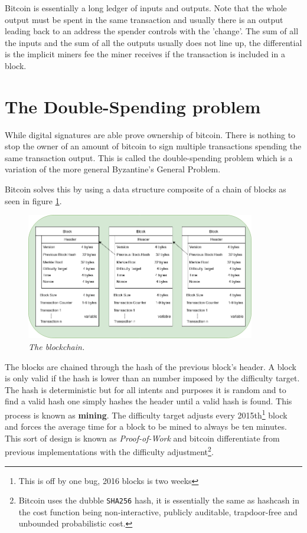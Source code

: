 Bitcoin is essentially a long ledger of inputs and outputs. Note that the whole output must be spent in the same transaction and usually there is an output leading back to an address the spender controls with the 'change'. The sum of all the inputs and the sum of all the outputs usually does not line up, the differential is the implicit miners fee the miner receives if the transaction is included in a block. 

\section{The Double-Spending problem}

While digital signatures are able prove ownership of bitcoin. There is nothing to stop the owner of an amount of bitcoin to sign multiple transactions spending the same transaction output. This is called the double-spending problem which is a variation of the more general Byzantine's General Problem.

Bitcoin solves this by using a data structure composite of a chain of blocks as seen in figure \ref{fig:blockchain}.

\begin{figure}[!htb]
	\hspace*{-2cm} 
	\centering
	\includegraphics[width=10cm]{blockchain.png}
	\caption{\textit{The blockchain. 
	}}
	\label{fig:blockchain}
	\hspace{2mm} 
\end{figure}

The blocks are chained through the hash of the previous block's header. A block is only valid if the hash is lower than an number imposed by the difficulty target. The hash is deterministic but for all intents and purposes it is random and to find a valid hash one simply hashes the header until a valid hash is found. This process is known as \textbf{mining}. The difficulty target adjusts every 2015th\footnote{This is off by one bug, 2016 blocks is two weeks} block\cite{repository:bitcoin} and forces the average time for a block to be mined to always be ten minutes. This sort of design is known as \textit{Proof-of-Work} and bitcoin differentiate from previous implementations with the difficulty adjustment\cite{back:hashcash}\footnote{Bitcoin uses the dubble \texttt{SHA256} hash, it is essentially the same as hashcash in the cost function being non-interactive, publicly auditable, trapdoor-free and unbounded probabilistic cost\cite{back:hashcash}.}.

